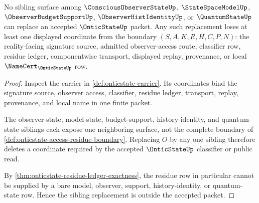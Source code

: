 \begin{theorem}
\label{thm:onticstate-sibling-noncollapse}
No sibling surface among $\ConsciousObserverStateUp$, $\StateSpaceModelUp$, $\ObserverBudgetSupportUp$, $\ObserverHistIdentityUp$, or $\QuantumStateUp$ can replace an accepted $\OnticStateUp$ packet. Any such replacement loses at least one displayed coordinate from the boundary $(S,A,K,R,H,C,P,N)$: the reality-facing signature source, admitted observer-access route, classifier row, residue ledger, componentwise transport, displayed replay, provenance, or local $\NameCert_{\OnticStateUp}$ row.
\end{theorem}
\begin{proof}
Inspect the carrier in \autoref{def:onticstate-carrier}. Its coordinates bind the signature source, observer access, classifier, residue ledger, transport, replay, provenance, and local name in one finite packet.

The observer-state, model-state, budget-support, history-identity, and quantum-state siblings each expose one neighboring surface, not the complete boundary of \autoref{def:onticstate-access-residue-boundary}. Replacing $O$ by any one sibling therefore deletes a coordinate required by the accepted $\OnticStateUp$ classifier or public read.

By \autoref{thm:onticstate-residue-ledger-exactness}, the residue row in particular cannot be supplied by a bare model, observer, support, history-identity, or quantum-state row. Hence the sibling replacement is outside the accepted packet.
\end{proof}

